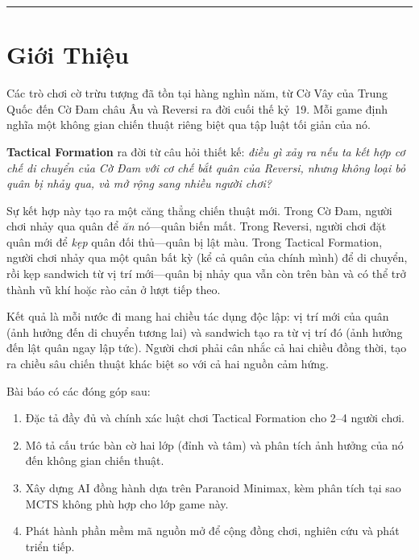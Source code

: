 \documentclass[12pt, a4paper]{article}
\begin{document}
\vspace{0.8em}
\hrule
\vspace{0.4em}

\tableofcontents
\newpage

\section{Giới Thiệu}

Các trò chơi cờ trừu tượng đã tồn tại hàng nghìn năm, từ Cờ Vây của
Trung Quốc đến Cờ Đam châu Âu và Reversi ra đời cuối thế kỷ~19.
Mỗi game định nghĩa một không gian chiến thuật riêng biệt qua tập luật
tối giản của nó.

\textbf{Tactical Formation} ra đời từ câu hỏi thiết kế: \emph{điều gì xảy
ra nếu ta kết hợp cơ chế di chuyển của Cờ Đam với cơ chế bắt quân của
Reversi, nhưng không loại bỏ quân bị nhảy qua, và mở rộng sang nhiều
người chơi?}

Sự kết hợp này tạo ra một căng thẳng chiến thuật mới. Trong Cờ Đam,
người chơi nhảy qua quân để \emph{ăn} nó---quân biến mất. Trong Reversi,
người chơi đặt quân mới để \emph{kẹp} quân đối thủ---quân bị lật màu.
Trong Tactical Formation, người chơi nhảy qua một quân bất kỳ (kể cả quân
của chính mình) để di chuyển, rồi kẹp sandwich từ vị trí mới---quân bị
nhảy qua vẫn còn trên bàn và có thể trở thành vũ khí hoặc rào cản ở lượt
tiếp theo.

Kết quả là mỗi nước đi mang hai chiều tác dụng độc lập: vị trí mới của
quân (ảnh hưởng đến di chuyển tương lai) và sandwich tạo ra từ vị trí đó
(ảnh hưởng đến lật quân ngay lập tức). Người chơi phải cân nhắc cả hai
chiều đồng thời, tạo ra chiều sâu chiến thuật khác biệt so với cả hai
nguồn cảm hứng.

Bài báo có các đóng góp sau:
\begin{enumerate}[label=(\roman*)]
  \item Đặc tả đầy đủ và chính xác luật chơi Tactical Formation cho
        2--4 người chơi.
  \item Mô tả cấu trúc bàn cờ hai lớp (đỉnh và tâm) và phân tích ảnh
        hưởng của nó đến không gian chiến thuật.
  \item Xây dựng AI đồng hành dựa trên Paranoid Minimax, kèm phân tích
        tại sao MCTS không phù hợp cho lớp game này.
  \item Phát hành phần mềm mã nguồn mở để cộng đồng chơi, nghiên cứu
        và phát triển tiếp.
\end{enumerate}
\end{document}
